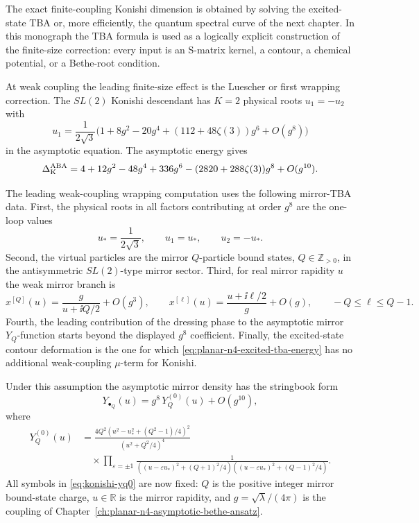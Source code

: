 The exact finite-coupling Konishi dimension is obtained by solving the
excited-state TBA or, more efficiently, the quantum spectral curve of the next
chapter.  In this monograph the TBA formula is used as a logically explicit
construction of the finite-size correction: every input is an S-matrix kernel,
a contour, a chemical potential, or a Bethe-root condition.

At weak coupling the leading finite-size effect is the Luescher or first
wrapping correction.  The \(SL(2)\) Konishi descendant has \(K=2\) physical
roots \(u_1=-u_2\) with
\[
  u_1=\frac{1}{2\sqrt3}
  \bigl(1+8g^2-20g^4+(112+48\zeta(3))g^6+O(g^8)\bigr)
\]
in the asymptotic equation.  The asymptotic energy gives
\[
  \Delta_{\rm K}^{\rm ABA}
  =
  4+12g^2-48g^4+336g^6-(2820+288\zeta(3))g^8+O(g^{10}).
\]

\begin{assumption}
\label{ass:konishi-leading-mirror-input}
The leading weak-coupling wrapping computation uses the following mirror-TBA
data.
First, the physical roots in all factors contributing at order \(g^8\) are
the one-loop values
\[
  u_\ast=\frac{1}{2\sqrt3},\qquad u_1=u_\ast,\qquad u_2=-u_\ast .
\]
Second, the virtual particles are the mirror \(Q\)-particle bound states,
\(Q\in\mathbb Z_{>0}\), in the antisymmetric \(SL(2)\)-type mirror sector.
Third, for real mirror rapidity \(u\) the weak mirror branch is
\[
  x^{[Q]}(u)=\frac{g}{u+\ii Q/2}+O(g^3),\qquad
  x^{[\ell]}(u)=\frac{u+\ii\ell/2}{g}+O(g),
  \qquad -Q\leq \ell\leq Q-1.
\]
Fourth, the leading contribution of the dressing phase to the asymptotic
mirror \(Y_Q\)-function starts beyond the displayed \(g^8\) coefficient.
Finally, the excited-state contour deformation is the one for which
\eqref{eq:planar-n4-excited-tba-energy} has no additional weak-coupling
\(\mu\)-term for Konishi.
\end{assumption}

Under this assumption the asymptotic mirror density has the stringbook form
\begin{equation}
  Y_{\bullet_Q}(u)
  =
  g^8\,Y_Q^{(0)}(u)+O(g^{10}),
  \label{eq:konishi-leading-yq}
\end{equation}
where
\begin{equation}
\begin{aligned}
  Y_Q^{(0)}(u)
  &=
  \frac{
    4Q^2\left(u^2-u_\ast^2+(Q^2-1)/4\right)^2
  }{
    \left(u^2+Q^2/4\right)^4
  }
\\
  &\quad\times
  \prod_{\varepsilon=\pm1}
  \frac{1}{
    \left((u-\varepsilon u_\ast)^2+(Q+1)^2/4\right)
    \left((u-\varepsilon u_\ast)^2+(Q-1)^2/4\right)
  } .
\end{aligned}
\label{eq:konishi-yq0}
\end{equation}
All symbols in \eqref{eq:konishi-yq0} are now fixed: \(Q\) is the positive
integer mirror bound-state charge, \(u\in\mathbb R\) is the mirror rapidity,
and \(g=\sqrt\lambda/(4\pi)\) is the coupling of
Chapter~\ref{ch:planar-n4-asymptotic-bethe-ansatz}.

